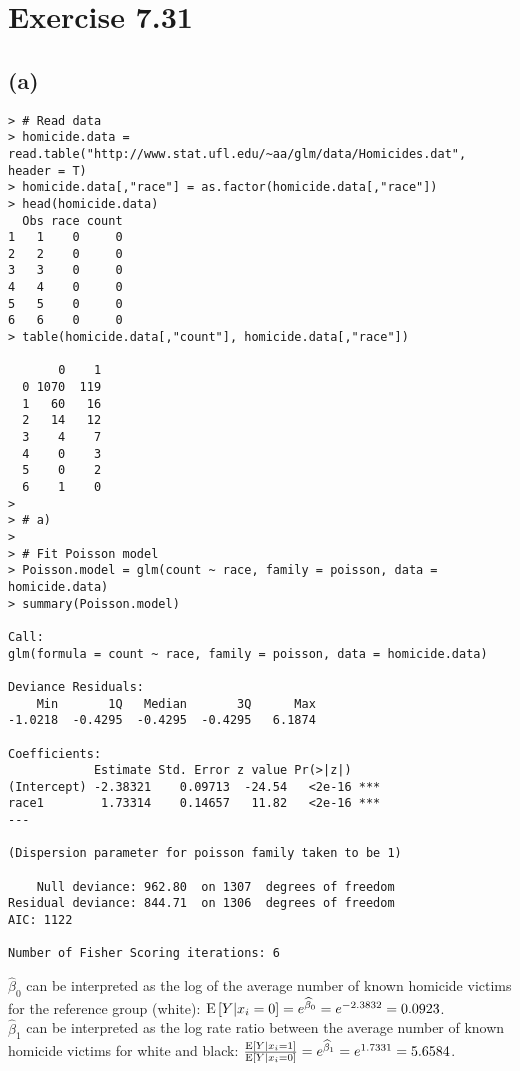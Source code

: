 \section*{Exercise 7.31}
\subsection*{(a)}

\begin{lstlisting}
> # Read data
> homicide.data = read.table("http://www.stat.ufl.edu/~aa/glm/data/Homicides.dat", header = T)
> homicide.data[,"race"] = as.factor(homicide.data[,"race"])
> head(homicide.data)
  Obs race count
1   1    0     0
2   2    0     0
3   3    0     0
4   4    0     0
5   5    0     0
6   6    0     0
> table(homicide.data[,"count"], homicide.data[,"race"])
   
       0    1
  0 1070  119
  1   60   16
  2   14   12
  3    4    7
  4    0    3
  5    0    2
  6    1    0
> 
> # a)
> 
> # Fit Poisson model
> Poisson.model = glm(count ~ race, family = poisson, data = homicide.data)
> summary(Poisson.model)

Call:
glm(formula = count ~ race, family = poisson, data = homicide.data)

Deviance Residuals: 
    Min       1Q   Median       3Q      Max  
-1.0218  -0.4295  -0.4295  -0.4295   6.1874  

Coefficients:
            Estimate Std. Error z value Pr(>|z|)    
(Intercept) -2.38321    0.09713  -24.54   <2e-16 ***
race1        1.73314    0.14657   11.82   <2e-16 ***
---

(Dispersion parameter for poisson family taken to be 1)

    Null deviance: 962.80  on 1307  degrees of freedom
Residual deviance: 844.71  on 1306  degrees of freedom
AIC: 1122

Number of Fisher Scoring iterations: 6
\end{lstlisting}

$\widehat{\beta}_{0}$ can be interpreted as the log of the average number of known homicide victims for the reference group (white): $\mathrm{E}\left[Y|x_{i} = 0\right] = e^{\widehat{\beta}_{0}} = e^{-2.3832} = 0.0923$.\\

$\widehat{\beta}_{1}$ can be interpreted as the log rate ratio between the average number of known homicide victims for white and black: $\frac{\mathrm{E}\left[Y|x_{i} = 1\right]}{\mathrm{E}\left[Y|x_{i} = 0\right]} = e^{\widehat{\beta}_{1}} = e^{1.7331} = 5.6584$.\\


